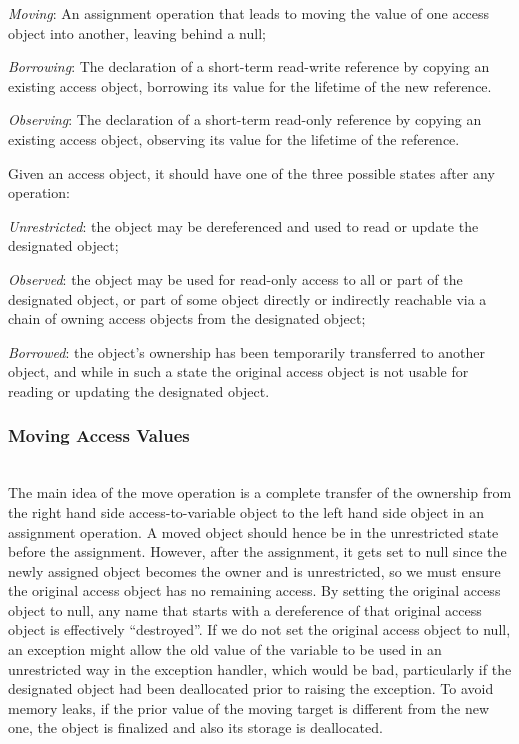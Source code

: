\documentclass{llncs}
\begin{document}
\begin{compactitem}
  \item \textit{Moving}: An assignment operation that leads to moving the value of one access object into another, leaving behind a null;
  \item \textit{Borrowing}: The declaration of a short-term read-write reference by copying an existing access object, borrowing its value for the lifetime of the new reference. 
  \item \textit{Observing}: The declaration of a short-term read-only reference by copying an existing access object, observing its value for the lifetime of the reference. 
\end{compactitem}

\smallskip
Given an access object, it should have one of the three possible states after any operation:

\begin{compactitem} 
  \item \textit {Unrestricted}: the object may be dereferenced and used to read or update the designated object;
  \item \textit {Observed}: the object may be used for read-only access to all or part of the designated object, or part of some object directly or indirectly reachable via a chain of owning access objects from the designated object;
  \item \textit {Borrowed}: the object's ownership has been temporarily transferred to another object,  and while in such a state the original access object is not usable for reading or updating the designated object.
\end{compactitem}


\subsubsection{Moving Access Values}
\label{sec:moving}
\ \\

The main idea of the move operation is a complete transfer of the ownership from the right hand side access-to-variable object to the left hand side object in an assignment operation.
A moved object should hence be in the unrestricted state before the assignment. However, after the assignment, it gets set to null since the newly assigned object becomes the owner
and is unrestricted, so we must ensure the original access object has no remaining access.  By setting the original access object to null, any name that starts with a dereference of
that original access object is effectively ``destroyed''. If we do not set the original access object to null, an exception might allow the old value of the variable to be used in
an unrestricted way in the exception handler, which would be bad, particularly if the designated object had been deallocated prior to raising the exception. To avoid memory leaks,
if the prior value of the moving target is different from the new one, the object is finalized and also its storage is deallocated.  
\end{document}
